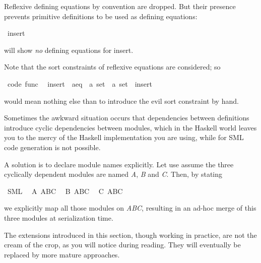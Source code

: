 \begin{isabellebody}
\begin{isamarkuptext}
  Reflexive defining equations by convention are dropped.
  But their presence prevents primitive definitions to be
  used as defining equations:%
\end{isamarkuptext}%
\isamarkuptrue%
\isamarkupfalse%
\ {\isacharparenleft}insert{\isacharparenright}%
\begin{isamarkuptext}%
will show \emph{no} defining equations for insert.

  Note that the sort constraints of reflexive equations
  are considered; so%
\end{isamarkuptext}%
\isamarkuptrue%
\isamarkupfalse%
\ {\isacharbrackleft}code\ func{\isacharbrackright}{\isacharcolon}\isanewline
\ \ {\isachardoublequoteopen}{\isacharparenleft}insert\ {\isasymColon}\ {\isacharprime}a{\isasymColon}eq\ {\isasymRightarrow}\ {\isacharprime}a\ set\ {\isasymRightarrow}\ {\isacharprime}a\ set{\isacharparenright}\ {\isacharequal}\ insert{\isachardoublequoteclose}%
\isadelimproof
\ %
\endisadelimproof
%
\isatagproof
\isacommand{{\isachardot}{\isachardot}}\isamarkupfalse%
%
\endisatagproof
{\isafoldproof}%
%
\isadelimproof
%
\endisadelimproof
%
\begin{isamarkuptext}%
would mean nothing else than to introduce the evil
  sort constraint by hand.%
\end{isamarkuptext}%
\isamarkuptrue%
%
\isamarkuptrue%
%
\begin{isamarkuptext}%
Sometimes the awkward situation occurs that dependencies
  between definitions introduce cyclic dependencies
  between modules, which in the Haskell world leaves
  you to the mercy of the Haskell implementation you are using,
  while for SML code generation is not possible.

  A solution is to declare module names explicitly.
  Let use assume the three cyclically dependent
  modules are named \emph{A}, \emph{B} and \emph{C}.
  Then, by stating%
\end{isamarkuptext}%
\isamarkuptrue%
\isamarkupfalse%
\ SML\isanewline
\ \ A\ ABC\isanewline
\ \ B\ ABC\isanewline
\ \ C\ ABC%
\begin{isamarkuptext}%
we explicitly map all those modules on \emph{ABC},
  resulting in an ad-hoc merge of this three modules
  at serialization time.%
\end{isamarkuptext}%
\isamarkuptrue%
%
\isamarkuptrue%
%
\begin{isamarkuptext}%
\begin{warn}
    The extensions introduced in this section, though working
    in practice, are not the cream of the crop, as you
    will notice during reading.  They will
    eventually be replaced by more mature approaches.
  \end{warn}


\end{isamarkuptext}
\end{isabellebody}
